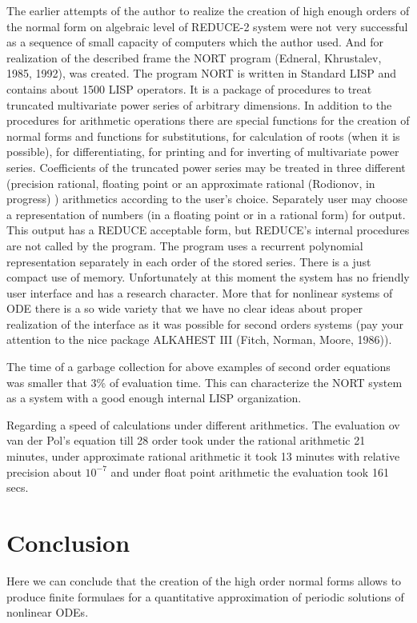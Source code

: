    The earlier attempts of the author to realize the creation of
high enough orders of the normal form on algebraic level of
REDUCE-2 system were not very successful as a sequence of
small capacity of computers which the author used. And for 
realization of the described frame  
the NORT program (Edneral, Khrustalev, 1985, 1992), was created. The 
program NORT is written in Standard LISP and contains about  
1500 LISP operators.  It  is a package of procedures to treat 
truncated multivariate power series of arbitrary dimensions. In 
addition to the procedures for arithmetic operations there are 
special functions for the creation of normal forms and functions 
for substitutions, for calculation of roots (when it is possible), 
for differentiating, for printing and for inverting of multivariate 
power series.
    Coefficients of the truncated power series may be treated  
in three different (precision rational, floating point or an 
approximate rational (Rodionov, in progress) ) arithmetics 
according to the user's choice.
Separately user may choose a representation of numbers (in a 
floating point or in a rational form) for output. This output has 
a REDUCE  acceptable form,  but  REDUCE's  internal procedures are 
not called by the program. The program uses a recurrent polynomial 
representation separately in each order of the stored series. There is
a just compact use of memory. Unfortunately at this
moment the system has no friendly user interface and has a research
character. More that for nonlinear systems of ODE there is a so
wide variety that we have no clear ideas about proper realization of
the interface as it was possible for second orders systems 
(pay your attention to the nice package ALKAHEST III 
(Fitch, Norman, Moore, 1986)).

   The time of a garbage collection for above examples of second
order equations was smaller that 3\% of evaluation time. This
can characterize the NORT system as a system with a good enough 
internal LISP organization. 

   Regarding a speed of calculations under different arithmetics.
   The evaluation ov van der Pol's equation till 28 order
took under the rational arithmetic 21 minutes, under approximate
rational arithmetic it took 13 minutes 
with relative precision
about $10^{-7}$ and under float point arithmetic the evaluation 
took 161 secs.

\section{Conclusion}
  Here we can conclude that the creation of the high order normal 
forms allows to produce finite formulaes for a quantitative 
approximation of periodic solutions of nonlinear ODEs.


